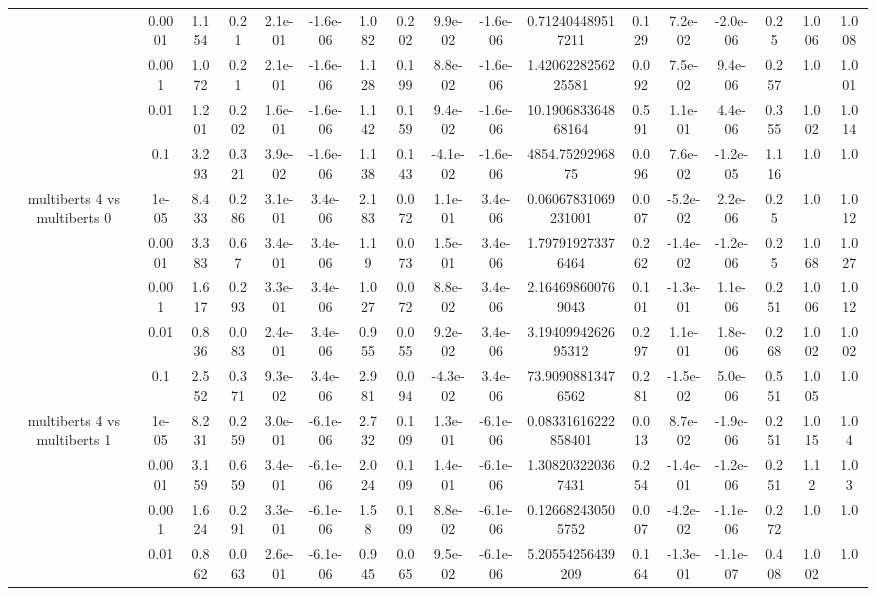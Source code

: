 \begin{tabular}{|c|c|c|c|c|c|c|c|c|c|c|c|c|c|c|c|c|}
 & 0.0001 & 1.154 & 0.21 & 2.1e-01 & -1.6e-06 & 1.082 & 0.202 & 9.9e-02 & -1.6e-06 & 0.712404489517211 & 0.129 & 7.2e-02 & -2.0e-06 & 0.25 & 1.006 & 1.008 \\
 & 0.001 & 1.072 & 0.21 & 2.1e-01 & -1.6e-06 & 1.128 & 0.199 & 8.8e-02 & -1.6e-06 & 1.4206228256225581 & 0.092 & 7.5e-02 & 9.4e-06 & 0.257 & 1.0 & 1.001 \\
 & 0.01 & 1.201 & 0.202 & 1.6e-01 & -1.6e-06 & 1.142 & 0.159 & 9.4e-02 & -1.6e-06 & 10.190683364868164 & 0.591 & 1.1e-01 & 4.4e-06 & 0.355 & 1.002 & 1.014 \\
 & 0.1 & 3.293 & 0.321 & 3.9e-02 & -1.6e-06 & 1.138 & 0.143 & -4.1e-02 & -1.6e-06 & 4854.7529296875 & 0.096 & 7.6e-02 & -1.2e-05 & 1.116 & 1.0 & 1.0 \\
\hline
\multirow{5}{*}{multiberts 4 vs multiberts 0} & 1e-05 & 8.433 & 0.286 & 3.1e-01 & 3.4e-06 & 2.183 & 0.072 & 1.1e-01 & 3.4e-06 & 0.06067831069231001 & 0.007 & -5.2e-02 & 2.2e-06 & 0.25 & 1.0 & 1.012 \\
 & 0.0001 & 3.383 & 0.67 & 3.4e-01 & 3.4e-06 & 1.19 & 0.073 & 1.5e-01 & 3.4e-06 & 1.797919273376464 & 0.262 & -1.4e-02 & -1.2e-06 & 0.25 & 1.068 & 1.027 \\
 & 0.001 & 1.617 & 0.293 & 3.3e-01 & 3.4e-06 & 1.027 & 0.072 & 8.8e-02 & 3.4e-06 & 2.164698600769043 & 0.101 & -1.3e-01 & 1.1e-06 & 0.251 & 1.006 & 1.012 \\
 & 0.01 & 0.836 & 0.083 & 2.4e-01 & 3.4e-06 & 0.955 & 0.055 & 9.2e-02 & 3.4e-06 & 3.1940994262695312 & 0.297 & 1.1e-01 & 1.8e-06 & 0.268 & 1.002 & 1.002 \\
 & 0.1 & 2.552 & 0.371 & 9.3e-02 & 3.4e-06 & 2.981 & 0.094 & -4.3e-02 & 3.4e-06 & 73.90908813476562 & 0.281 & -1.5e-02 & 5.0e-06 & 0.551 & 1.005 & 1.0 \\
\hline
\multirow{5}{*}{multiberts 4 vs multiberts 1} & 1e-05 & 8.231 & 0.259 & 3.0e-01 & -6.1e-06 & 2.732 & 0.109 & 1.3e-01 & -6.1e-06 & 0.08331616222858401 & 0.013 & 8.7e-02 & -1.9e-06 & 0.251 & 1.015 & 1.04 \\
 & 0.0001 & 3.159 & 0.659 & 3.4e-01 & -6.1e-06 & 2.024 & 0.109 & 1.4e-01 & -6.1e-06 & 1.308203220367431 & 0.254 & -1.4e-01 & -1.2e-06 & 0.251 & 1.12 & 1.03 \\
 & 0.001 & 1.624 & 0.291 & 3.3e-01 & -6.1e-06 & 1.58 & 0.109 & 8.8e-02 & -6.1e-06 & 0.126682430505752 & 0.007 & -4.2e-02 & -1.1e-06 & 0.272 & 1.0 & 1.0 \\
 & 0.01 & 0.862 & 0.063 & 2.6e-01 & -6.1e-06 & 0.945 & 0.065 & 9.5e-02 & -6.1e-06 & 5.20554256439209 & 0.164 & -1.3e-01 & -1.1e-07 & 0.408 & 1.002 & 1.0 \\

\end{tabular}
